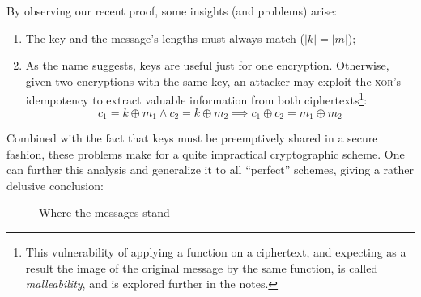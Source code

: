 By observing our recent proof, some insights (and problems) arise:
\begin{enumerate}
    \item The key and the message's lengths must always match ($|k| = |m|$);
    \item As the name suggests, keys are useful just for one encryption. Otherwise, given two encryptions with the same key, an attacker may exploit the \textsc{xor}'s idempotency to extract valuable information from both ciphertexts\footnote{This vulnerability of applying a function on a ciphertext, and expecting as a result the image of the original message by the same function, is called \emph{malleability}, and is explored further in the notes.}:
    \[
        c_1 = k \oplus m_1 \wedge c_2 = k \oplus m_2 \implies c_1 \oplus c_2 = m_1 \oplus m_2
    \]
    
\end{enumerate}


Combined with the fact that keys must be preemptively shared in a secure fashion, these problems make for a quite impractical cryptographic scheme. One can further this analysis and generalize it to all ``perfect'' schemes, giving a rather delusive conclusion:

\begin{figure}[h]
    \centering
    \def\firstcircle{(0,0) circle (1.5cm)}
    \def\secondcircle{(60:0) circle (0.9cm)}
    \caption{Where the messages stand}
\end{figure}

